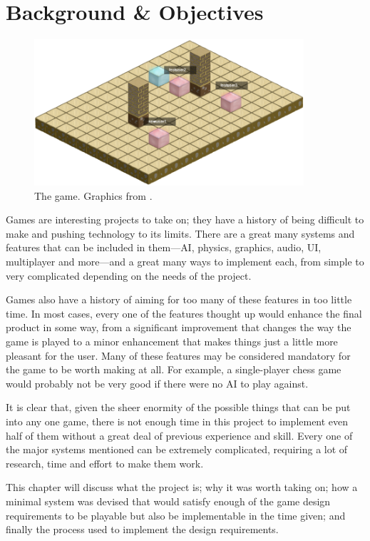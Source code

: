 \chapter{Background \& Objectives}

\begin{figure}[H]
    \centering
    \includegraphics[width=10cm]{Images/the_game.png}
    \caption{The game. Graphics from \cite{GameArt}.}
    \label{fig:the_game}
\end{figure}

Games are interesting projects to take on; they have a history of being difficult to make and pushing technology to its limits. There are a great many systems and features that can be included in them---AI, physics, graphics, audio, UI, multiplayer and more---and a great many ways to implement each, from simple to very complicated depending on the needs of the project.

Games also have a history of aiming for too many of these features in too little time. In most cases, every one of the features thought up would enhance the final product in some way, from a significant improvement that changes the way the game is played to a minor enhancement that makes things just a little more pleasant for the user. Many of these features may be considered mandatory for the game to be worth making at all. For example, a single-player chess game would probably not be very good if there were no AI to play against.

It is clear that, given the sheer enormity of the possible things that can be put into any one game, there is not enough time in this project to implement even half of them without a great deal of previous experience and skill. Every one of the major systems mentioned can be extremely complicated, requiring a lot of research, time and effort to make them work.

This chapter will discuss what the project is; why it was worth taking on; how a minimal system was devised that would satisfy enough of the game design requirements to be playable but also be implementable in the time given; and finally the process used to implement the design requirements.

